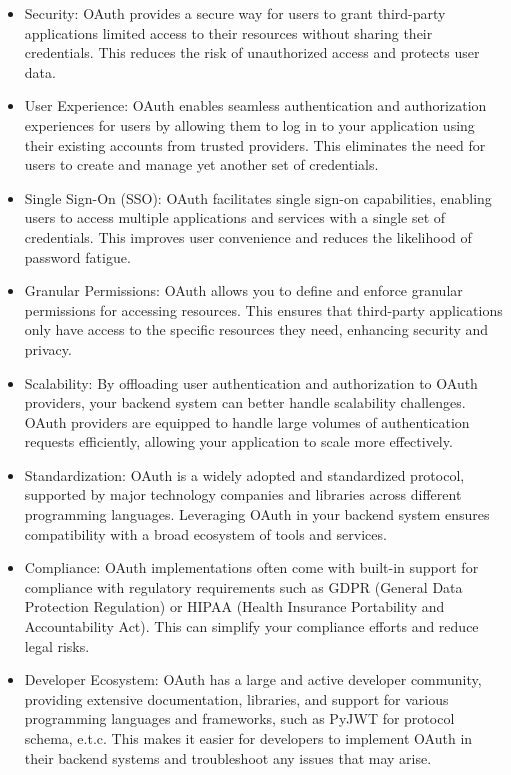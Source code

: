\begin{itemize}
    \item {Security:} OAuth provides a secure way for users to grant third-party applications limited access to their resources without sharing their credentials. This reduces the risk of unauthorized access and protects user data.

    \item {User Experience:} OAuth enables seamless authentication and authorization experiences for users by allowing them to log in to your application using their existing accounts from trusted providers. This eliminates the need for users to create and manage yet another set of credentials.

    \item {Single Sign-On (SSO):} OAuth facilitates single sign-on capabilities, enabling users to access multiple applications and services with a single set of credentials. This improves user convenience and reduces the likelihood of password fatigue.

    \item {Granular Permissions:} OAuth allows you to define and enforce granular permissions for accessing resources. This ensures that third-party applications only have access to the specific resources they need, enhancing security and privacy.

    \item {Scalability:} By offloading user authentication and authorization to OAuth providers, your backend system can better handle scalability challenges. OAuth providers are equipped to handle large volumes of authentication requests efficiently, allowing your application to scale more effectively.

    \item {Standardization:} OAuth is a widely adopted and standardized protocol, supported by major technology companies and libraries across different programming languages. Leveraging OAuth in your backend system ensures compatibility with a broad ecosystem of tools and services.

    \item {Compliance:} OAuth implementations often come with built-in support for compliance with regulatory requirements such as GDPR (General Data Protection Regulation) or HIPAA (Health Insurance Portability and Accountability Act). This can simplify your compliance efforts and reduce legal risks.
    \item {Developer Ecosystem:} OAuth has a large and active developer community, providing extensive documentation, libraries, and support for various 
    programming languages and frameworks, such as PyJWT for protocol schema, e.t.c. This makes it easier for developers to implement OAuth in their backend 
    systems and troubleshoot any issues that may arise.
\end{itemize}


